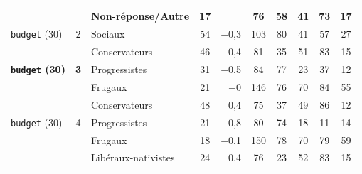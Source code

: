 {\begin{tabular}{lclcrccccc}
 &  & \cellcolor{ced!15}Non-réponse/Autre & \cellcolor{ced!15}17 & \cellcolor{ced!15} & \cellcolor{ced!15}76 & \cellcolor{ced!15}58 & \cellcolor{ced!15}41 & \cellcolor{ced!15}73 & \cellcolor{ced!15}17 \\
\midrule
\texttt{budget} (30) & 2 & \cellcolor{mgt!15}Sociaux & \cellcolor{mgt!15}54 & \cellcolor{mgt!15}$-$0,3\hspace{1em} & \cellcolor{mgt!15}103 & \cellcolor{mgt!15}80 & \cellcolor{mgt!15}41 & \cellcolor{mgt!15}57 & \cellcolor{mgt!15}27 \\
 &  & \cellcolor{cdroite!15}Conservateurs & \cellcolor{cdroite!15}46 & \cellcolor{cdroite!15}0,4\hspace{1em} & \cellcolor{cdroite!15}81 & \cellcolor{cdroite!15}35 & \cellcolor{cdroite!15}51 & \cellcolor{cdroite!15}83 & \cellcolor{cdroite!15}15 \\
\midrule
{\bfseries \texttt{budget} (30)} & \textbf{3} & \cellcolor{cleft!15}Progressistes & \cellcolor{cleft!15}31 & \cellcolor{cleft!15}$-$0,5\hspace{1em} & \cellcolor{cleft!15}84 & \cellcolor{cleft!15}77 & \cellcolor{cleft!15}23 & \cellcolor{cleft!15}37 & \cellcolor{cleft!15}12 \\
 &  & \cellcolor{cfrug!15}Frugaux & \cellcolor{cfrug!15}21 & \cellcolor{cfrug!15}$-$0\hspace{1em} & \cellcolor{cfrug!15}146 & \cellcolor{cfrug!15}76 & \cellcolor{cfrug!15}70 & \cellcolor{cfrug!15}84 & \cellcolor{cfrug!15}55 \\
 &  & \cellcolor{cdroite!15}Conservateurs & \cellcolor{cdroite!15}48 & \cellcolor{cdroite!15}0,4\hspace{1em} & \cellcolor{cdroite!15}75 & \cellcolor{cdroite!15}37 & \cellcolor{cdroite!15}49 & \cellcolor{cdroite!15}86 & \cellcolor{cdroite!15}12 \\
\midrule
\texttt{budget} (30) & 4 & \cellcolor{cleft!15}Progressistes & \cellcolor{cleft!15}21 & \cellcolor{cleft!15}$-$0,8\hspace{1em} & \cellcolor{cleft!15}80 & \cellcolor{cleft!15}74 & \cellcolor{cleft!15}18 & \cellcolor{cleft!15}11 & \cellcolor{cleft!15}14 \\
 &  & \cellcolor{cfrug!15}Frugaux & \cellcolor{cfrug!15}18 & \cellcolor{cfrug!15}$-$0,1\hspace{1em} & \cellcolor{cfrug!15}150 & \cellcolor{cfrug!15}78 & \cellcolor{cfrug!15}70 & \cellcolor{cfrug!15}79 & \cellcolor{cfrug!15}59 \\
 &  & \cellcolor{ccdroit!15}Libéraux-nativistes & \cellcolor{ccdroit!15}24 & \cellcolor{ccdroit!15}0,4\hspace{1em} & \cellcolor{ccdroit!15}76 & \cellcolor{ccdroit!15}23 & \cellcolor{ccdroit!15}52 & \cellcolor{ccdroit!15}83 & \cellcolor{ccdroit!15}15 \\

\end{tabular}}
